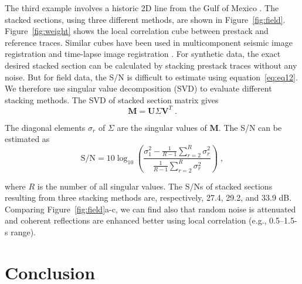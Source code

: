 The third example involves a historic 2D line
from the Gulf of Mexico \cite[]{Claerbout05}. The
stacked sections, using three different methods,
are shown in Figure~\ref{fig:field}. Figure~\ref{fig:weight} shows the local
correlation cube between prestack and reference
traces. Similar cubes have been used in multicomponent
seismic image registration \cite[]{Fomel05,Fomel07b} and time-lapse image
registration \cite[]{Fomel07}. For synthetic
data, the exact desired stacked section can be calculated
by stacking prestack traces without any
noise. But for field data, the S/N is difficult to estimate
using equation~\ref{eq:eq12}. We therefore use singular
value decomposition (SVD) \cite{Andrews76} to evaluate different stacking
methods. The SVD of stacked section matrix gives
      \begin{equation}
          \mathbf{M} = \mathbf{U} \Sigma \mathbf{V}^T\;.
        \label{eq:eq13}
      \end{equation}

The diagonal elements $\sigma_r$ of $\Sigma$ are the singular values of 
$\mathbf{M}$. The S/N can be estimated as \cite[]{Freire88,Peterson88,Grion98}
      \begin{equation}
          \textrm{S/N} = 10 \log_{10} \left(\frac{\sigma^2_1 - \frac{1}{R-1} \displaystyle\sum_{r=2}^{R}\sigma^2_r}{\frac{1}{R-1}\displaystyle\sum_{r=2}^{R}\sigma^2_r} \right) \;,
        \label{eq:eq14}
      \end{equation}

where $R$ is the number of all singular values. The S/Ns of stacked
sections resulting from three stacking methods are, respectively,
27.4, 29.2, and 33.9 dB. Comparing Figure~\ref{fig:field}a-c, we can find also
that random noise is attenuated and coherent reflections are enhanced
better using local correlation (e.g., 0.5--1.5-s range).

 \section{Conclusion}

